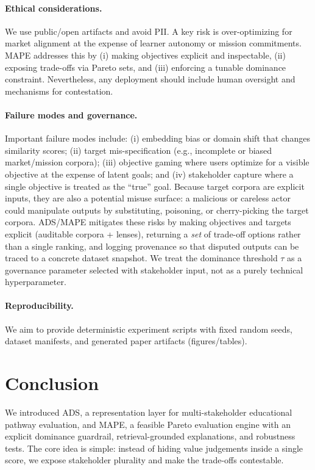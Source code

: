 \documentclass{article}
\newif\ifdraft      %
\newcommand{\draftonly}[1]{\ifdraft #1\fi}
\newcommand{\todo}[1]{\textcolor{red}{\textbf{[TODO: #1]}}}
\newcommand{\todo}[1]{}
\newcommand{\ADS}{\textsc{ADS}\xspace}
\newcommand{\MAPE}{\textsc{MAPE}\xspace}
\begin{document}
\paragraph{Ethical considerations.}
We use public/open artifacts and avoid PII. A key risk is over-optimizing for market alignment at the expense of learner autonomy or mission commitments. \MAPE addresses this by (i) making objectives explicit and inspectable, (ii) exposing trade-offs via Pareto sets, and (iii) enforcing a tunable dominance constraint. Nevertheless, any deployment should include human oversight and mechanisms for contestation.

\paragraph{Failure modes and governance.}
Important failure modes include: (i) {embedding bias} or domain shift that changes similarity scores; (ii) {target mis-specification} (e.g., incomplete or biased market/mission corpora); (iii) {objective gaming} where users optimize for a visible objective at the expense of latent goals; and (iv) {stakeholder capture} where a single objective is treated as the ``true'' goal. Because target corpora are explicit inputs, they are also a potential misuse surface: a malicious or careless actor could manipulate outputs by substituting, poisoning, or cherry-picking the target corpora. \ADS/\MAPE mitigates these risks by making objectives and targets explicit (auditable corpora + lenses), returning a \emph{set} of trade-off options rather than a single ranking, and logging provenance so that disputed outputs can be traced to a concrete dataset snapshot. We treat the dominance threshold $\tau$ as a governance parameter selected with stakeholder input, not as a purely technical hyperparameter.

\paragraph{Reproducibility.}
We aim to provide deterministic experiment scripts with fixed random seeds, dataset manifests, and generated paper artifacts (figures/tables). \draftonly{\todo{Add concrete commands + seeds once repo is frozen.}}



\section{Conclusion}
We introduced \ADS, a representation layer for multi-stakeholder educational pathway evaluation, and \MAPE, a feasible Pareto evaluation engine with an explicit dominance guardrail, retrieval-grounded explanations, and robustness tests. The core idea is simple: instead of hiding value judgements inside a single score, we expose stakeholder plurality and make the trade-offs contestable.




\end{document}
